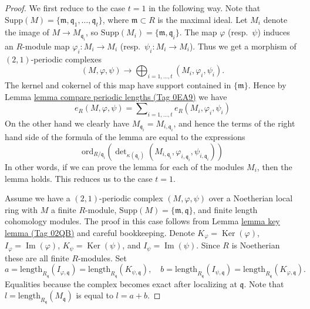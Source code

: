 \documentclass{amsart}
\theoremstyle{plain}
\theoremstyle{definition}
\theoremstyle{remark}
\numberwithin{equation}{subsection}
\def\Ker{\mathop{\mathrm{Ker}}}
\def\Im{\mathop{\mathrm{Im}}}
\begin{document}
\begin{proof}
We first reduce to the case $t = 1$ in the following way.
Note that
$\text{Supp}(M) = \{\mathfrak m, \mathfrak q_1, \ldots, \mathfrak q_t\}$,
where $\mathfrak m \subset R$ is the maximal ideal.
Let $M_i$ denote the image of $M \to M_{\mathfrak q_i}$,
so $\text{Supp}(M_i) = \{\mathfrak m, \mathfrak q_i\}$.
The map $\varphi$ (resp.\ $\psi$) induces an $R$-module map
$\varphi_i : M_i \to M_i$ (resp.\ $\psi_i : M_i \to M_i$).
Thus we get a morphism of $(2, 1)$-periodic complexes
$$
(M, \varphi, \psi) \longrightarrow
\bigoplus\nolimits_{i = 1, \ldots, t} (M_i, \varphi_i, \psi_i).
$$
The kernel and cokernel of this map have support contained in
$\{\mathfrak m\}$. Hence by Lemma \href{https://stacks.math.columbia.edu/tag/0EA9}{lemma compare periodic lengths (Tag 0EA9)}
we have
$$
e_R(M, \varphi, \psi) =
\sum\nolimits_{i = 1, \ldots, t}
e_R(M_i, \varphi_i, \psi_i)
$$
On the other hand we clearly have $M_{\mathfrak q_i} = M_{i, \mathfrak q_i}$,
and hence the terms of the right hand side of the formula of the
lemma are equal to the expressions
$$
\text{ord}_{R/\mathfrak q_i}\left(
\det\nolimits_{\kappa(\mathfrak q_i)}
(M_{i, \mathfrak q_i}, \varphi_{i, \mathfrak q_i}, \psi_{i, \mathfrak q_i})
\right)
$$
In other words, if we can prove the lemma for each of the modules
$M_i$, then the lemma holds. This reduces us to the case $t = 1$.

\medskip\noindent
Assume we have a $(2, 1)$-periodic complex $(M, \varphi, \psi)$
over a Noetherian local ring with $M$ a finite $R$-module,
$\text{Supp}(M) = \{\mathfrak m, \mathfrak q\}$, and
finite length cohomology modules. The proof in this case
follows from Lemma \href{https://stacks.math.columbia.edu/tag/02QB}{lemma key lemma (Tag 02QB)} and careful bookkeeping.
Denote
$K_\varphi = \Ker(\varphi)$,
$I_\varphi = \Im(\varphi)$,
$K_\psi = \Ker(\psi)$, and
$I_\psi = \Im(\psi)$.
Since $R$ is Noetherian these are all finite $R$-modules.
Set
$$
a = \text{length}_{R_{\mathfrak q}}(I_{\varphi, \mathfrak q})
= \text{length}_{R_{\mathfrak q}}(K_{\psi, \mathfrak q}),
\quad
b = \text{length}_{R_{\mathfrak q}}(I_{\psi, \mathfrak q})
= \text{length}_{R_{\mathfrak q}}(K_{\varphi, \mathfrak q}).
$$
Equalities because the complex becomes exact after localizing at
$\mathfrak q$. Note that $l = \text{length}_{R_{\mathfrak q}}(M_{\mathfrak q})$
is equal to $l = a + b$.


\end{proof}
\end{document}
